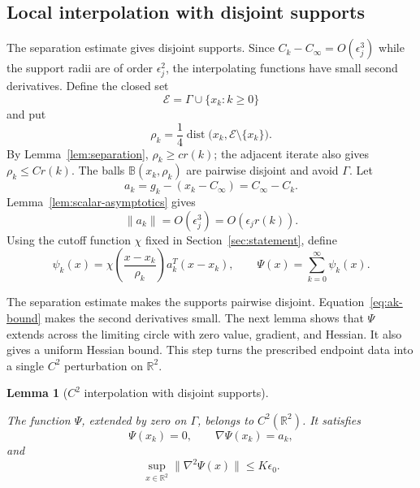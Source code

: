\documentclass[11pt]{article}
\newtheorem{lemma}[theorem]{Lemma}
\newcommand{\R}{\mathbb R}
\begin{document}
\subsection{Local interpolation with disjoint supports}

The separation estimate gives disjoint supports.  Since
$C_k-C_\infty=O(\epsilon_j^3)$ while the support radii are of order
$\epsilon_j^2$, the interpolating functions have small second derivatives.
Define the closed set
\[
\mathcal E=\Gamma\cup\{x_k:k\ge0\}
\]
and put
\begin{equation}\label{eq:rho-k}
\rho_k=\frac14\operatorname{dist}
\bigl(x_k,\mathcal E\setminus\{x_k\}\bigr).
\end{equation}
By Lemma~\ref{lem:separation}, $\rho_k\ge c r(k)$; the adjacent iterate
also gives $\rho_k\le Cr(k)$.  The balls
$\mathbb B(x_k,\rho_k)$ are pairwise disjoint and avoid $\Gamma$.  Let
\begin{equation}\label{eq:correction-vector}
a_k=g_k-(x_k-C_\infty)=C_\infty-C_k.
\end{equation}
Lemma~\ref{lem:scalar-asymptotics} gives
\begin{equation}\label{eq:ak-bound}
\|a_k\|=O(\epsilon_j^3)=O(\epsilon_jr(k)).
\end{equation}
Using the cutoff function $\chi$ fixed in Section~\ref{sec:statement}, define
\begin{equation}\label{eq:local-interpolants}
\psi_k(x)=
\chi\!\left(\frac{x-x_k}{\rho_k}\right)a_k^T(x-x_k),
\qquad
\Psi(x)=\sum_{k=0}^\infty\psi_k(x).
\end{equation}


The separation estimate makes the supports pairwise disjoint.
Equation~\eqref{eq:ak-bound} makes the second derivatives small.  The next
lemma shows that $\Psi$ extends across the limiting circle with zero value,
gradient, and Hessian.  It also gives a uniform Hessian bound.  This step turns
the prescribed endpoint data into a single $C^2$ perturbation on $\R^2$.

\begin{lemma}[$C^2$ interpolation with disjoint supports]
\label{lem:disjoint-interpolation}



The function $\Psi$, extended by zero on $\Gamma$, belongs to
$C^2(\R^2)$.  It satisfies
\begin{equation}\label{eq:interpolation-jets}
\Psi(x_k)=0,\qquad \nabla\Psi(x_k)=a_k,
\end{equation}
and
\begin{equation}\label{eq:interpolation-hessian-bound}
\sup_{x\in\R^2}\|\nabla^2\Psi(x)\|
\le K\epsilon_0.
\end{equation}
\end{lemma}
\end{document}
